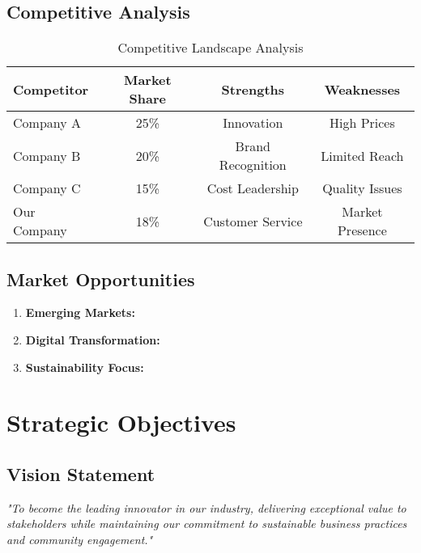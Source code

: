 \documentclass[11pt,a4paper]{article}
\begin{document}
\subsection{Competitive Analysis}

\begin{table}[h]
\centering
\begin{tabular}{@{}lccc@{}}
\toprule
\textbf{Competitor} & \textbf{Market Share} & \textbf{Strengths} & \textbf{Weaknesses} \\
\midrule
Company A & 25\% & Innovation & High Prices \\
Company B & 20\% & Brand Recognition & Limited Reach \\
Company C & 15\% & Cost Leadership & Quality Issues \\
Our Company & 18\% & Customer Service & Market Presence \\
\bottomrule
\end{tabular}
\caption{Competitive Landscape Analysis}
\end{table}

\lipsum[9-10]

\subsection{Market Opportunities}

\begin{enumerate}[leftmargin=*]
  \item \textbf{Emerging Markets:} \lipsum[11][1-4]
  \item \textbf{Digital Transformation:} \lipsum[12][1-4]
  \item \textbf{Sustainability Focus:} \lipsum[13][1-4]
\end{enumerate}

\section{Strategic Objectives}

\subsection{Vision Statement}

\begin{tcolorbox}[
  colback=accent!5,
  colframe=accent,
  boxrule=2pt,
  arc=4pt,
  center title
]
\textit{"To become the leading innovator in our industry, delivering exceptional value to stakeholders while maintaining our commitment to sustainable business practices and community engagement."}
\end{tcolorbox}
\end{document}
